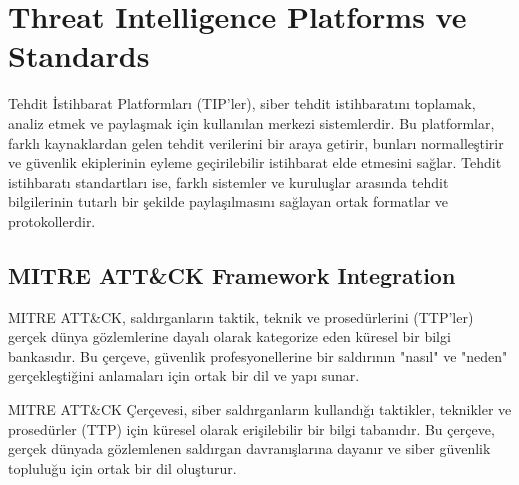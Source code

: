 \section{Threat Intelligence Platforms ve Standards}

Tehdit İstihbarat Platformları (TIP'ler), siber tehdit istihbaratını toplamak, analiz etmek ve paylaşmak için kullanılan merkezi sistemlerdir. Bu platformlar, farklı kaynaklardan gelen tehdit verilerini bir araya getirir, bunları normalleştirir ve güvenlik ekiplerinin eyleme geçirilebilir istihbarat elde etmesini sağlar. Tehdit istihbaratı standartları ise, farklı sistemler ve kuruluşlar arasında tehdit bilgilerinin tutarlı bir şekilde paylaşılmasını sağlayan ortak formatlar ve protokollerdir.

\subsection{MITRE ATT\&CK Framework Integration}

MITRE ATT\&CK, saldırganların taktik, teknik ve prosedürlerini (TTP'ler) gerçek dünya gözlemlerine dayalı olarak kategorize eden küresel bir bilgi bankasıdır. Bu çerçeve, güvenlik profesyonellerine bir saldırının "nasıl" ve "neden" gerçekleştiğini anlamaları için ortak bir dil ve yapı sunar.

MITRE ATT\&CK Çerçevesi, siber saldırganların kullandığı taktikler, teknikler ve prosedürler (TTP) için küresel olarak erişilebilir bir bilgi tabanıdır. Bu çerçeve, gerçek dünyada gözlemlenen saldırgan davranışlarına dayanır ve siber güvenlik topluluğu için ortak bir dil oluşturur.

